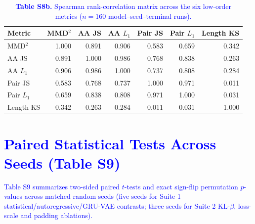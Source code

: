 \documentclass[11pt,a4paper]{article}
\newcommand{\rev}[1]{\textcolor{blue}{#1}}
\begin{document}
\begin{table}[H]
\centering\footnotesize
\caption*{\rev{\textbf{Table S8b.} Spearman rank-correlation matrix across the six low-order metrics ($n=160$ model--seed--terminal runs).}}
\begin{tabular}{lrrrrrr}
\toprule
Metric & MMD$^2$ & AA JS & AA $L_1$ & Pair JS & Pair $L_1$ & Length KS \\
\midrule
MMD$^2$ & 1.000 & 0.891 & 0.906 & 0.583 & 0.659 & 0.342 \\
AA JS & 0.891 & 1.000 & 0.986 & 0.768 & 0.838 & 0.263 \\
AA $L_1$ & 0.906 & 0.986 & 1.000 & 0.737 & 0.808 & 0.284 \\
Pair JS & 0.583 & 0.768 & 0.737 & 1.000 & 0.971 & 0.011 \\
Pair $L_1$ & 0.659 & 0.838 & 0.808 & 0.971 & 1.000 & 0.031 \\
Length KS & 0.342 & 0.263 & 0.284 & 0.011 & 0.031 & 1.000 \\
\bottomrule
\end{tabular}
\end{table}

\FloatBarrier
\section{\rev{Paired Statistical Tests Across Seeds (Table S9)}}
\rev{Table S9 summarizes two-sided paired $t$-tests and exact sign-flip permutation $p$-values across matched random seeds (five seeds for Suite 1 statistical/autoregressive/GRU-VAE contrasts; three seeds for Suite 2 KL-$\beta$, loss-scale and padding ablations).}
\end{document}
